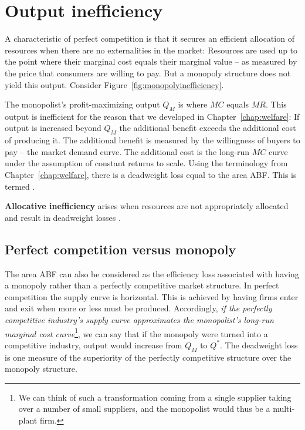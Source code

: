 \section{Output inefficiency}\label{sec:ch10sec4}

A characteristic of perfect competition is that it secures an efficient
allocation of resources when there are no externalities in the market:
Resources are used up to the point where their marginal cost equals their
marginal value -- as measured by the price that consumers are willing to
pay. But a monopoly structure does not yield this output. Consider Figure~\ref{fig:monopolyinefficiency}.



\newhtmlpage

The monopolist's profit-maximizing output $Q_{M}$ is where $MC$ equals $MR$.
This output is inefficient for the reason that we developed in Chapter~\ref{chap:welfare}:
If output is increased beyond $Q_{M}$ the additional benefit
exceeds the additional cost of producing it. The additional benefit is
measured by the willingness of buyers to pay -- the market demand curve. The
additional cost is the long-run $MC$ curve under the assumption of constant
returns to scale. Using the terminology from Chapter~\ref{chap:welfare},
there is a deadweight loss equal to the area ABF. This is termed %
.

\begin{DefBox}
	\textbf{Allocative inefficiency} arises when resources are not appropriately allocated and result in deadweight losses .
\end{DefBox}

\newhtmlpage

\subsection*{Perfect competition versus monopoly}

The area ABF can also be considered as the efficiency loss associated with
having a monopoly rather than a perfectly competitive market structure. In
perfect competition the supply curve is horizontal. This is achieved by
having firms enter and exit when more or less must be produced. Accordingly, 
\textit{if the perfectly competitive industry's supply curve approximates
	the monopolist's long-run marginal cost curve}\footnote{%
	We can think of such a transformation coming from a single supplier taking
	over a number of small suppliers, and the monopolist would thus be a
	multi-plant firm.}, we can say that if the monopoly were turned into a
competitive industry, output would increase from $Q_{M}$ to $Q^{*}$. The
deadweight loss is one measure of the superiority of the perfectly
competitive structure over the monopoly structure.

